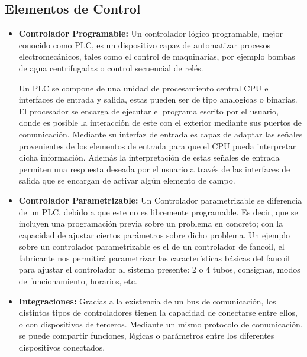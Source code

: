 \subsection{Elementos de Control}
\begin{itemize}
\item \textbf{Controlador Programable:}
Un controlador lógico programable, mejor conocido como PLC, es un dispositivo capaz de automatizar procesos electromecánicos, tales como el control de maquinarias, por ejemplo bombas de agua centrifugadas o control secuencial de relés. 

Un PLC se compone de una unidad de procesamiento central CPU e interfaces de entrada y salida, estas pueden ser de tipo analogicas o binarias. El procesador se encarga de ejecutar el programa escrito por el usuario, donde es posible la interacción de este con el exterior mediante sus puertos de comunicación. Mediante su interfaz de entrada es capaz de adaptar las señales provenientes de los elementos de entrada para que el CPU pueda interpretar dicha información. Además la interpretación de estas señales de entrada permiten una respuesta deseada por el usuario a través de las interfaces de salida que se encargan de activar algún elemento de campo. 

\item \textbf{Controlador Parametrizable:}
Un Controlador parametrizable se diferencia de un PLC, debido a que este no es libremente programable. Es decir, que se incluyen una programación previa sobre un problema en concreto; con la capacidad de ajustar ciertos parámetros sobre dicho problema. Un ejemplo sobre un controlador parametrizable es el de un controlador de
fancoil, el fabricante nos permitirá parametrizar las características básicas del fancoil para ajustar el controlador al sistema presente: 2 o 4 tubos, consignas, modos de funcionamiento, horarios, etc.

\item \textbf{Integraciones:}
Gracias a la existencia de un bus de comunicación, los distintos tipos de controladores tienen la capacidad de conectarse entre ellos, o con dispositivos de terceros. Mediante un mismo protocolo de comunicación, se puede compartir funciones, lógicas o parámetros entre los diferentes dispositivos conectados.

\end{itemize}

